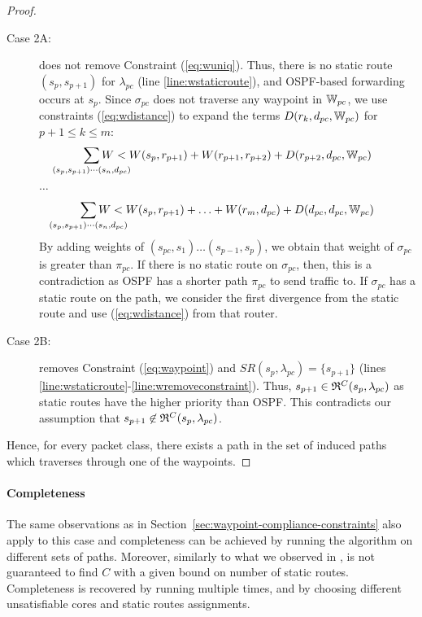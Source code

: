 \begin{proof}
\begin{description}
	\item[Case 2A:]
	 does not remove Constraint (\ref{eq:wuniq}). 
	Thus, there is no static route $(s_p, s_{p+1})$ for
	$\lambda_{pc}$ (line \ref{line:wstaticroute}), and 
	OSPF-based forwarding occurs at $s_{p}$. 
	Since $\sigma_{pc}$ does not traverse any 
	waypoint in $\mathbb{W}_{pc}$,
	we use constraints (\ref{eq:wdistance}) 
	to expand the terms $D(r_k, d_{pc}, \mathbb{W}_{pc})$ for $p+1 \leq k \leq m$:
	\[
	\sum_{\mathclap{\substack{(s_{p}, s_{p+1})\cdots(s_n, d_{pc})}}} 
	W < W(s_{p}, r_{p+1})+ W(r_{p+1}, r_{p+2}) + D(r_{p+2}, d_{pc},\waypt_{pc})
	\] 
	\begin{center}
		$\ldots$
	\end{center}
	\[
	\sum_{\mathclap{\substack{(s_{p}, s_{p+1})\cdots(s_n, d_{pc})}}} 
	W < W(s_{p}, r_{p+1})+ \ldots + W(r_{m}, d_{pc}) + D(d_{pc}, d_{pc}, \waypt_{pc})
	\]
	By adding weights of $(s_{pc}, s_1)\ldots(s_{p-1}, s_p)$, we obtain that weight of $\sigma_{pc}$ 
	is greater than $\pi_{pc}$. If there is no static route on $\sigma_{pc}$, then, this is a contradiction
	as OSPF has a shorter path $\pi_{pc}$ to send traffic to.  If $\sigma_{pc}$ has a static route on the
	path, we consider the first divergence from the static route and use (\ref{eq:wdistance}) from that
	router. 
	
	\item[Case 2B:]
	 removes Constraint (\ref{eq:waypoint}) 
	and $SR(s_p, \lambda_{pc}) = \{s_{p+1}\}$ (lines \ref{line:wstaticroute}-\ref{line:wremoveconstraint}). 
	Thus, $s_{p+1} \in \mathfrak{R}^C(s_{p}, \lambda_{pc})$ as static routes 
	have the higher priority than OSPF. This contradicts our assumption
	that $s_{p+1} \not\in \mathfrak{R}^C(s_{p}, \lambda_{pc})$. 
	\end{description}
	
	Hence, for every packet class, 
	there exists a path in the set of induced paths which traverses through one of the waypoints. 
	\end{proof}
\fi

\paragraph{Completeness}
The same observations as in Section~\ref{sec:waypoint-compliance-constraints}
also apply to this case and completeness can be achieved by running the algorithm
on different sets of paths.
%
	Moreover, similarly to what we observed in ,  is not 
	guaranteed to find $C$ with a given bound on number of static routes.
Completeness is recovered by running  multiple times, and by choosing different
unsatisfiable cores and static routes assignments. 
